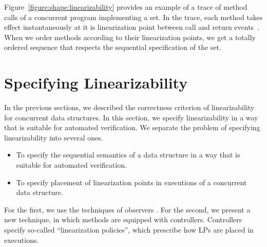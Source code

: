 %
Figure~\ref{figure:shape:linearizability} provides an example of a trace of method calls of a concurrent program implementing a set.
In the trace, each method takes effect
instantaneously at it is linearization point
between call and return events~\cite{HeWi:linearizability}. When we order methods according to their linearization points, we get a totally ordered sequence that respects the sequential specification of the set.



\endgroup

\chapter{Specifying Linearizability}
In the previous sections, we described the correctness criterion of linearizability for concurrent data structures. In this section, we specify linearizability in a way that is suitable for automated verification.
We separate the problem of specifying linearizability into several ones.
\begin{itemize}

 \item  To specify the sequential semantics of a data structure in a way that is suitable for automated verification.
  \item To specify placement of linearization points in executions of a concurrent data structure.
  	 
\end{itemize}
  For the first, we use the techniques of observers \cite{AHHR:integrated:rep}. For the second, we present a new technique, in which methods are equipped with controllers. Controllers specify so-called ``linearization policies'', which prescribe how LPs are placed in executions.
 

